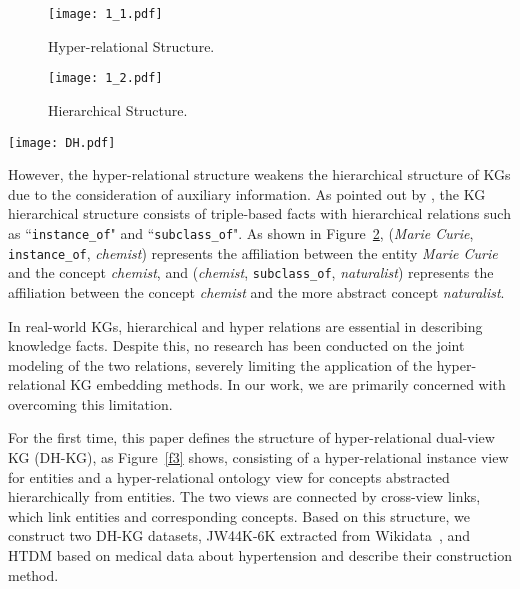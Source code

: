 \documentclass[letterpaper]{article} \usepackage{aaai23}  \usepackage{times}  \usepackage{helvet}  \usepackage{courier}  \usepackage[hyphens]{url}  \usepackage{graphicx} \urlstyle{rm} \def\UrlFont{\rm}  \usepackage{natbib}  \usepackage{caption} \frenchspacing  \setlength{\pdfpagewidth}{8.5in}  \setlength{\pdfpageheight}{11in}  \usepackage{times}
\begin{document}
\begin{figure}[h!t]
    \centering
    \texttt{[image: 1\_1.pdf]}
    \caption{Hyper-relational Structure.}
    \label{f1}
\end{figure}

\begin{figure}[h!t]
    \centering
    \texttt{[image: 1\_2.pdf]}
    \caption{Hierarchical Structure.}
    \label{f2}
\end{figure}

\begin{figure*}[h!t]
    \centering
    \texttt{[image: DH.pdf]}
    \caption{An example on Dual-view Hyper-Relational KG Structure, where a hyper-relational fact in the instance view consists of a main triple (\textit{Marie Curie}, \textit{receive}, \textit{Nobel Prize in Physics}) and auxiliary attribute-value descriptions (\textit{year}: \textit{1903}, \textit{together\_with}: \textit{Pierre Curie}, \textit{together\_with}: \textit{Antoine Henri Becquerel}). Additionally, entities in instance view and concepts in ontology view are linked across views through the ``\texttt{instance\_of}" relation, and many concepts in the ontology view are connected by the ``\texttt{subclass\_of}" relation.}
    \label{f3}
\end{figure*}

However, the hyper-relational structure weakens the hierarchical structure of KGs due to the consideration of auxiliary information. As pointed out by \citet{KACC}, the KG hierarchical structure consists of triple-based facts with hierarchical relations such as ``\texttt{instance\_of}" and ``\texttt{subclass\_of}". As shown in Figure~\ref{f2}, (\textit{Marie Curie}, \texttt{instance\_of}, \textit{chemist}) represents the affiliation between the entity \textit{Marie Curie} and the concept \textit{chemist}, and (\textit{chemist}, \texttt{subclass\_of}, \textit{naturalist}) represents the affiliation between the concept \textit{chemist} and the more abstract concept \textit{naturalist}. 

In real-world KGs, hierarchical and hyper relations are essential in describing knowledge facts. Despite this, no research has been conducted on the joint modeling of the two relations, severely limiting the application of the hyper-relational KG embedding methods. In our work, we are primarily concerned with overcoming this limitation.

For the first time, this paper defines the structure of hyper-relational dual-view KG (DH-KG), as Figure~\ref{f3} shows, consisting of a hyper-relational instance view for entities and a hyper-relational ontology view for concepts abstracted hierarchically from entities. The two views are connected by cross-view links, which link entities and corresponding concepts. Based on this structure, we construct two DH-KG datasets, JW44K-6K extracted from Wikidata~\citep{Wikidata}, and HTDM based on medical data about hypertension and describe their construction method.
\end{document}
